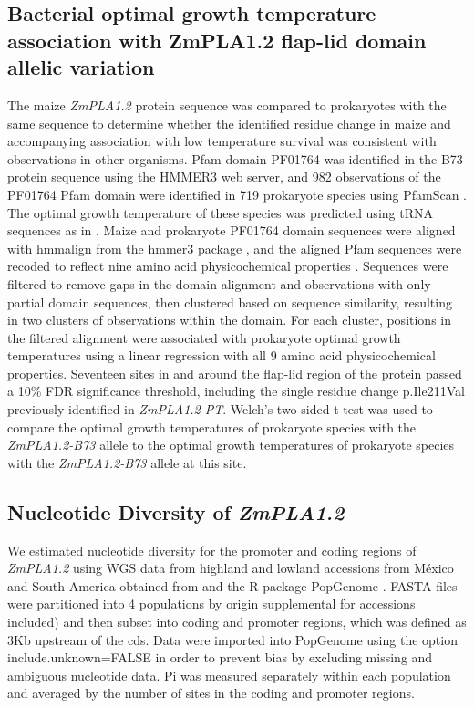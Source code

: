 \documentclass[9pt,twocolumn,twoside,lineno]{BioRxiv}
\begin{document}
\subsection{Bacterial optimal growth temperature association with ZmPLA1.2 flap-lid domain allelic variation}
The maize \textit{ZmPLA1.2} protein sequence was compared to prokaryotes with the same sequence to determine whether the identified residue change in maize and accompanying association with low temperature survival was consistent with observations in other organisms. 
Pfam domain PF01764 was identified in the B73 protein sequence using the HMMER3 web server, and 982 observations of the PF01764 Pfam domain were identified in 719 prokaryote species using PfamScan \cite{Potter2018-tk, El-Gebali2019-pw}. 
The optimal growth temperature of these species was predicted using tRNA sequences as in \cite{Cimen2020-dm}. 
Maize and prokaryote PF01764 domain sequences were aligned with hmmalign from the hmmer3 package \cite{Eddy2011-pd}, and the aligned Pfam sequences were recoded to reflect nine amino acid physicochemical properties \cite{Li2016-ut}. 
Sequences were filtered to remove gaps in the domain alignment and observations with only partial domain sequences, then clustered based on sequence similarity, resulting in two clusters of observations within the domain. 
For each cluster, positions in the filtered alignment were associated with prokaryote optimal growth temperatures using a linear regression with all 9 amino acid physicochemical properties. 
Seventeen sites in and around the flap-lid region of the protein passed a 10\% FDR significance threshold, including the single residue change p.Ile211Val previously identified in \textit{ZmPLA1.2-PT}. 
Welch’s two-sided t-test was used to compare the optimal growth temperatures of prokaryote species with the \textit{ZmPLA1.2-B73} allele to the optimal growth temperatures of prokaryote species with the \textit{ZmPLA1.2-B73} allele at this site.

\subsection{Nucleotide Diversity of \textit{ZmPLA1.2} }
We estimated nucleotide diversity for the promoter and coding regions of \textit{ZmPLA1.2} using WGS data from highland and lowland accessions from México and South America obtained from \cite{Wang2017-bc} and the R package PopGenome \cite{Pfeifer2014-bg}. 
FASTA files were partitioned into 4 populations by origin  supplemental for accessions included) and then subset into coding and promoter regions, which was defined as 3Kb upstream of the cds. 
Data were imported into PopGenome using the option include.unknown=FALSE in order to prevent bias by excluding missing and ambiguous nucleotide data.
Pi was measured separately within each population and averaged by the number of sites in the coding and promoter regions. 
\end{document}
